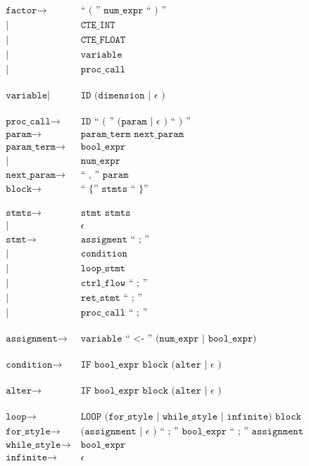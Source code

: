 \begin{align*}
	\texttt{factor}
	\rightarrow&\ \texttt{`` ( '' num\_expr `` ) ''}\\
            |&\ \texttt{CTE\_INT}\\
            |&\ \texttt{CTE\_FLOAT}\\
            |&\ \texttt{variable}\\
            |&\ \texttt{proc\_call}\\
	\phantom{0}\\
	\texttt{variable}
            |&\ \texttt{ID (dimension | } \epsilon \texttt{ )}\\
	\phantom{0}\\
	\texttt{proc\_call}
	\rightarrow&\ \texttt{ID `` ( '' (param | } \epsilon \texttt{ ) `` ) ''}\\
	\texttt{param}
	\rightarrow&\ \texttt{param\_term next\_param}\\
	\texttt{param\_term}
	\rightarrow&\ \texttt{bool\_expr}\\
            |&\ \texttt{num\_expr}\\
	\texttt{next\_param}
	\rightarrow&\ \texttt{`` , '' param}\\
	\texttt{block}
	\rightarrow&\ \texttt{`` \{ '' stmts `` \} ''}\\
	\phantom{0}\\
	\texttt{stmts}
	\rightarrow&\ \texttt{stmt stmts}\\
            |&\ \epsilon\\
	\texttt{stmt}
	\rightarrow&\ \texttt{assigment  `` ; ''}\\
            |&\ \texttt{condition}\\
            |&\ \texttt{loop\_stmt}\\
            |&\ \texttt{ctrl\_flow `` ; ''}\\
            |&\ \texttt{ret\_stmt `` ; ''}\\
            |&\ \texttt{proc\_call `` ; ''}\\
	\phantom{0}\\
	\texttt{assignment}
	\rightarrow&\ \texttt{variable `` <- '' (num\_expr | bool\_expr)}\\
	\phantom{0}\\
	\texttt{condition}
	\rightarrow&\ \texttt{IF bool\_expr block (alter | } \epsilon \texttt{ )}\\
	\phantom{0}\\
	\texttt{alter}
	\rightarrow&\ \texttt{IF bool\_expr block (alter | } \epsilon \texttt{ )}\\
	\phantom{0}\\
	\texttt{loop}
	\rightarrow&\ \texttt{LOOP (for\_style | while\_style | infinite) block}\\
	\texttt{for\_style}
	\rightarrow&\ \texttt{
            (assignment | } \epsilon \texttt{ ) 
            `` ; '' bool\_expr `` ; '' assignment }\\
	\texttt{while\_style}
	\rightarrow&\ \texttt{bool\_expr}\\
	\texttt{infinite}
	\rightarrow&\ \epsilon\\
\end{align*}


